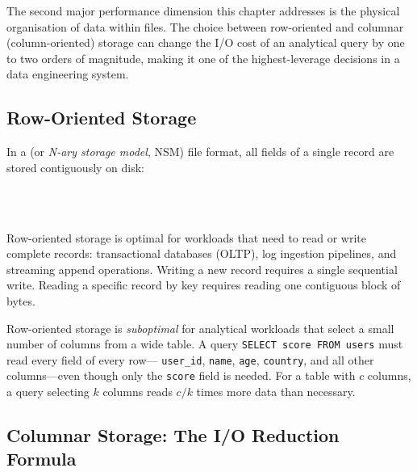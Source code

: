 The second major performance dimension this chapter addresses is the
physical organisation of data within files. The choice between
row-oriented and columnar (column-oriented) storage can change the
I/O cost of an analytical query by one to two orders of magnitude,
making it one of the highest-leverage decisions in a data engineering
system.

\subsection{Row-Oriented Storage}
\label{subsec:row-oriented}

In a  (or \emph{N-ary storage model}, NSM) file
format, all fields of a single record are stored contiguously on disk:

\begin{center}
\setlength{\fboxsep}{4pt}
\\[2pt]
\\[2pt]
\end{center}

Row-oriented storage is optimal for workloads that need to read or
write complete records: transactional databases (OLTP), log ingestion
pipelines, and streaming append operations. Writing a new record requires
a single sequential write. Reading a specific record by key requires
reading one contiguous block of bytes.

Row-oriented storage is \emph{suboptimal} for analytical workloads that
select a small number of columns from a wide table. A query
\texttt{SELECT score FROM users} must read every field of every row---
\texttt{user\_id}, \texttt{name}, \texttt{age}, \texttt{country},
and all other columns---even though only the \texttt{score} field is
needed. For a table with $c$ columns, a query selecting $k$ columns
reads $c/k$ times more data than necessary.

\subsection{Columnar Storage: The I/O Reduction Formula}
\label{subsec:columnar}

